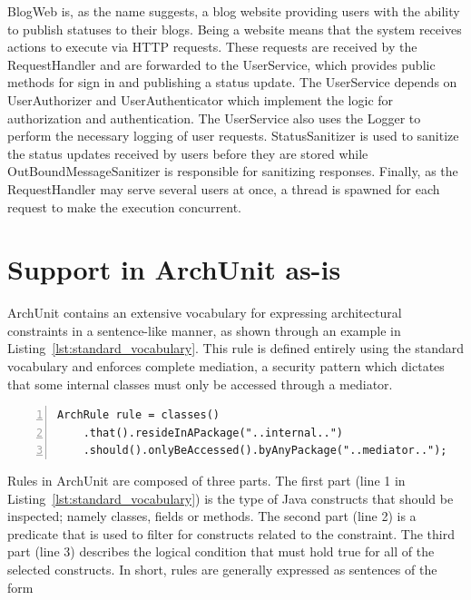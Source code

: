 BlogWeb is, as the name suggests, a blog website providing users with the ability to publish statuses to their blogs. Being a website means that the system receives actions to execute via HTTP requests. These requests are received by the RequestHandler and are forwarded to the UserService, which provides public methods for sign in and publishing a status update. The UserService depends on UserAuthorizer and UserAuthenticator which implement the logic for authorization and authentication. The UserService also uses the Logger to perform the necessary logging of user requests. StatusSanitizer is used to sanitize the status updates received by users before they are stored while OutBoundMessageSanitizer is responsible for sanitizing responses. Finally, as the RequestHandler may serve several users at once, a thread is spawned for each request to make the execution concurrent. 


\section{Support in ArchUnit as-is}\label{sec:as-is}
ArchUnit contains an extensive vocabulary for expressing architectural constraints in a sentence-like manner, as shown through an example in Listing~\ref{lst:standard_vocabulary}. This rule is defined entirely using the standard vocabulary and enforces complete mediation, a security pattern which dictates that some internal classes must only be accessed through a mediator.


\begin{center}
\begin{minipage}{0.90\linewidth}
\begin{lstlisting}[caption={Example of a rule that is expressed with the standard vocabulary.}, captionpos=b, label=lst:standard_vocabulary, numbers=left]
ArchRule rule = classes()
    .that().resideInAPackage("..internal..")
    .should().onlyBeAccessed().byAnyPackage("..mediator..");
\end{lstlisting}
\end{minipage}
\end{center}

Rules in ArchUnit are composed of three parts. The first part (line 1 in Listing~\ref{lst:standard_vocabulary}) is the type of Java constructs that should be inspected; namely classes, fields or methods. The second part (line 2) is a predicate that is used to filter for constructs related to the constraint. The third part (line 3) describes the logical condition that must hold true for all of the selected constructs. In short, rules are generally expressed as sentences of the form 

